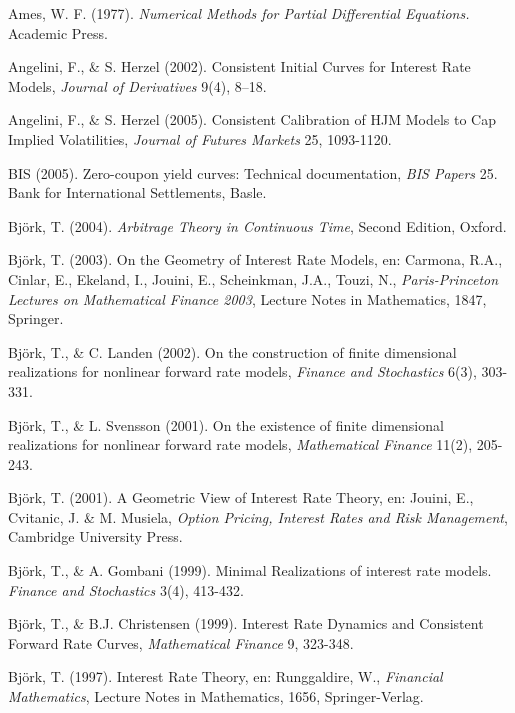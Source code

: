 \begin{thebibliography}{}

{\sc Ames, W. F. (1977).} \emph{Numerical Methods for Partial
  Differential Equations.} Academic Press.

{\sc Angelini, F., \& S. Herzel (2002).} Consistent Initial Curves
for Interest Rate Models, \emph{Journal of Derivatives} 9(4), 8--18.

{\sc Angelini, F., \& S. Herzel (2005).} Consistent Calibration of
HJM Models to Cap Implied Volatilities, \emph{Journal of Futures Markets} 25, 1093-1120.

BIS (2005). Zero-coupon yield curves: Technical documentation, \emph{BIS Papers}
25. Bank for International Settlements, Basle. 

{\sc Bj\"ork, T. (2004).} \emph{Arbitrage Theory in Continuous Time}, Second Edition, Oxford.

{\sc Bj\"ork, T. (2003).} On the Geometry of Interest Rate Models, en:
Carmona, R.A., Cinlar, E., Ekeland, I., Jouini, E., Scheinkman, J.A., Touzi, N.,
\emph{Paris-Princeton Lectures on Mathematical Finance 2003}, Lecture Notes in
Mathematics, 1847, Springer.  

{\sc Bj\"ork, T., \& C. Landen (2002).} On the construction of finite
dimensional realizations for nonlinear forward rate models,
\emph{Finance and Stochastics} 6(3), 303-331. 

{\sc Bj\"ork, T., \& L. Svensson (2001).} On the existence of finite
dimensional realizations for nonlinear forward rate models,
\emph{Mathematical Finance} 11(2), 205-243. 

{\sc Bj\"ork, T. (2001).} A Geometric View of Interest Rate Theory, en:
Jouini, E., Cvitanic, J. \&  M. Musiela, \emph{Option Pricing, Interest
Rates and Risk Management}, Cambridge University Press.  

{\sc Bj\"ork, T., \& A. Gombani (1999).} Minimal Realizations of interest rate
models. \emph{Finance and Stochastics} 3(4), 413-432.

{\sc Bj\"ork, T., \& B.J. Christensen (1999).} Interest Rate Dynamics
and Consistent Forward Rate Curves, \emph{Mathematical Finance} 9,
323-348.  

{\sc Bj\"ork, T. (1997).} Interest Rate Theory, en: Runggaldire, W., \emph{Financial Mathematics}, Lecture Notes in Mathematics, 1656, Springer-Verlag. 


\end{thebibliography}

